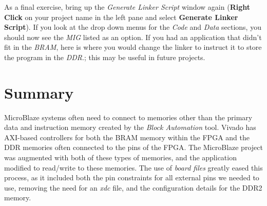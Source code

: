 \documentclass[11pt]{article}
\begin{document}
As a final exercise, bring up the \textit{Generate Linker Script} window again (\textbf{Right Click} on your project name in the left pane and select \textbf{Generate Linker Script}). If you look at the drop down menus for the \textit{Code} and \textit{Data} sections, you should now see the \textit{MIG} listed as an option. If you had an application that didn't fit in the \textit{BRAM}, here is where you would change the linker to instruct it to store the program in the \textit{DDR}.; this may be useful in future projects.




\section{Summary}
\label{sec:summary}
MicroBlaze systems often need to connect to memories other than the primary data and instruction memory created by the \textit{Block Automation} tool. Vivado has AXI-based controllers for both the BRAM memory within the FPGA and the DDR memories often connected to the pins of the FPGA. The MicroBlaze project was augmented with both of these types of memories, and the application modified to read/write to these memories. The use of \textit{board files} greatly eased this process, as it included both the pin constraints for all external pins we needed to use, removing the need for an \textit{xdc} file, and the configuration details for the DDR2 memory.



\end{document}
